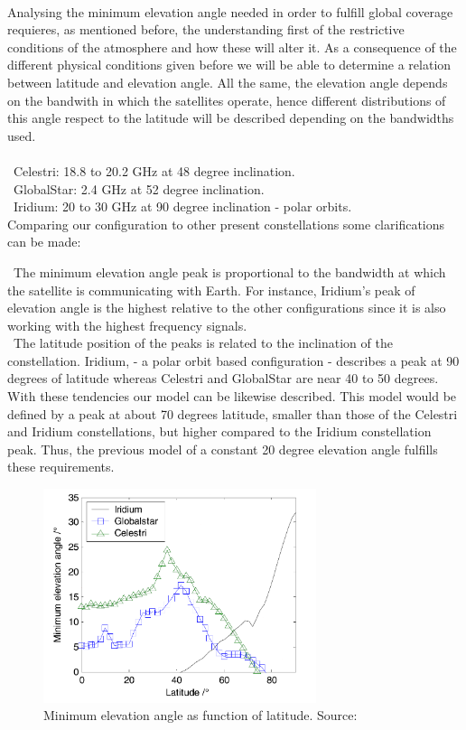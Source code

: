 \paragraph{}

Analysing the minimum elevation angle needed in order to fulfill global coverage requieres, as mentioned before, the understanding first of the restrictive conditions of the atmosphere and how these will alter it. As a consequence of the different physical conditions given before we will be able to determine a relation between latitude and elevation angle. All the same, the elevation angle depends on the bandwith in which the satellites operate, hence different distributions of this angle respect to the latitude will be described depending on the bandwidths used. 


\paragraph{}

\textendash\ Celestri: 18.8 to 20.2 GHz at 48 degree inclination.\\
\textendash\ GlobalStar: 2.4 GHz at 52 degree inclination.\\
\textendash\ Iridium: 20 to 30 GHz at 90 degree inclination - polar orbits.\\

Comparing our configuration to other present constellations some clarifications can be made: 

\textendash\ The minimum elevation angle peak is proportional to the bandwidth at which the satellite is communicating with Earth. For instance, Iridium's peak of elevation angle is the highest relative to the other configurations since it is also working with the highest frequency signals. \\

\textendash\ The latitude position of the peaks is related to the inclination of the constellation. Iridium, - a polar orbit based configuration - describes a peak at 90 degrees of latitude whereas Celestri and GlobalStar are near 40 to 50 degrees. \\

With these tendencies our model can be likewise described. This model would be defined by a peak at about 70 degrees latitude, smaller than those of the Celestri and Iridium constellations, but higher compared to the Iridium constellation peak. Thus, the previous model of a constant 20 degree elevation angle fulfills these requirements. 


\begin{figure}[h]
\includegraphics[width=8cm]{latitudes}
\centering
\caption{Minimum elevation angle as function of latitude. Source: \cite{Li2016}}
\end{figure}
